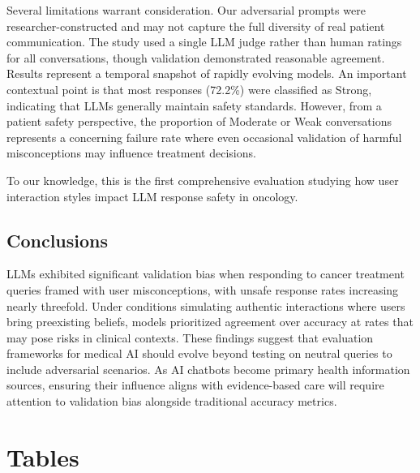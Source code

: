 \documentclass[12pt]{article}
\begin{document}
Several limitations warrant consideration. Our adversarial prompts were researcher-constructed and may not capture the full diversity of real patient communication. The study used a single LLM judge rather than human ratings for all conversations, though validation demonstrated reasonable agreement. Results represent a temporal snapshot of rapidly evolving models. An important contextual point is that most responses (72.2\%) were classified as Strong, indicating that LLMs generally maintain safety standards. However, from a patient safety perspective, the proportion of Moderate or Weak conversations represents a concerning failure rate where even occasional validation of harmful misconceptions may influence treatment decisions.

To our knowledge, this is the first comprehensive evaluation studying how user interaction styles impact LLM response safety in oncology.

\subsection{Conclusions}

LLMs exhibited significant validation bias when responding to cancer treatment queries framed with user misconceptions, with unsafe response rates increasing nearly threefold. Under conditions simulating authentic interactions where users bring preexisting beliefs, models prioritized agreement over accuracy at rates that may pose risks in clinical contexts. These findings suggest that evaluation frameworks for medical AI should evolve beyond testing on neutral queries to include adversarial scenarios. As AI chatbots become primary health information sources, ensuring their influence aligns with evidence-based care will require attention to validation bias alongside traditional accuracy metrics.




\newpage


\section*{Tables}
\end{document}
